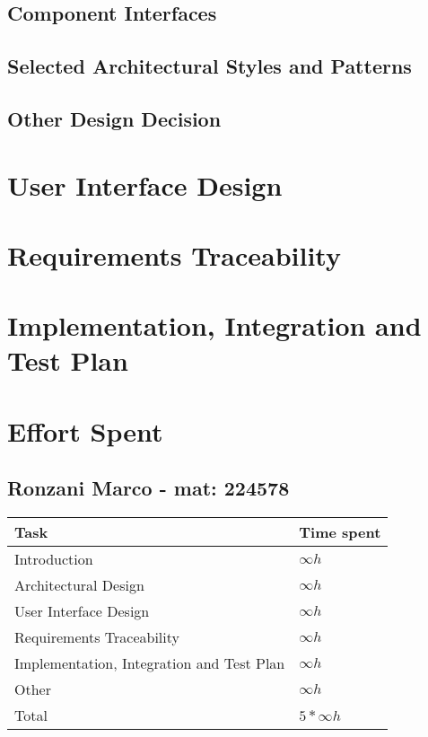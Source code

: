 \documentclass[11pt]{article}
\begin{document}
\subsection{Component Interfaces}

\subsection{Selected Architectural Styles and Patterns}

\subsection{Other Design Decision}

\section{User Interface Design}

\section{Requirements Traceability}

\section{Implementation, Integration and Test Plan}


\section{Effort Spent}

\subsection{Ronzani Marco - mat: 224578}

\begin{tabular}{|l|l|}
    \hline
    \textbf{Task} & \textbf{Time spent} \\
    \hline
    Introduction & $\infty h$ \\
    \hline
    Architectural Design & $\infty h$ \\
    \hline
    User Interface Design & $\infty h$ \\
    \hline
    Requirements Traceability & $\infty h$ \\
    \hline
    Implementation, Integration and Test Plan & $\infty h$ \\
    \hline
    Other & $\infty h$ \\
    \hline
    \hline
    Total & $5*\infty h$ \\
    \hline
\end{tabular}
\end{document}
